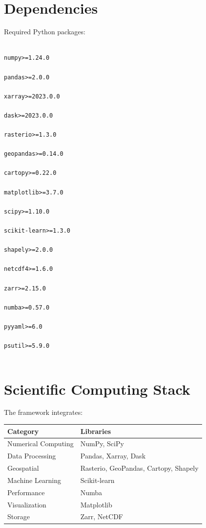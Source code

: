 \documentclass[11pt,a4paper]{article}
\begin{document}
\section{Dependencies}



Required Python packages:



\begin{verbatim}

numpy>=1.24.0

pandas>=2.0.0

xarray>=2023.0.0

dask>=2023.0.0

rasterio>=1.3.0

geopandas>=0.14.0

cartopy>=0.22.0

matplotlib>=3.7.0

scipy>=1.10.0

scikit-learn>=1.3.0

shapely>=2.0.0

netcdf4>=1.6.0

zarr>=2.15.0

numba>=0.57.0

pyyaml>=6.0

psutil>=5.9.0


\end{verbatim}




\section{Scientific Computing Stack}



The framework integrates:



\begin{table}[h]

\centering

\begin{tabular}{ll}

\toprule

Category & Libraries \\

\midrule

Numerical Computing &
NumPy, SciPy \\


Data Processing &
Pandas, Xarray, Dask \\


Geospatial &
Rasterio, GeoPandas, Cartopy, Shapely \\


Machine Learning &
Scikit-learn \\


Performance &
Numba \\


Visualization &
Matplotlib \\


Storage &
Zarr, NetCDF \\


\bottomrule

\end{tabular}

\end{table}
\end{document}
